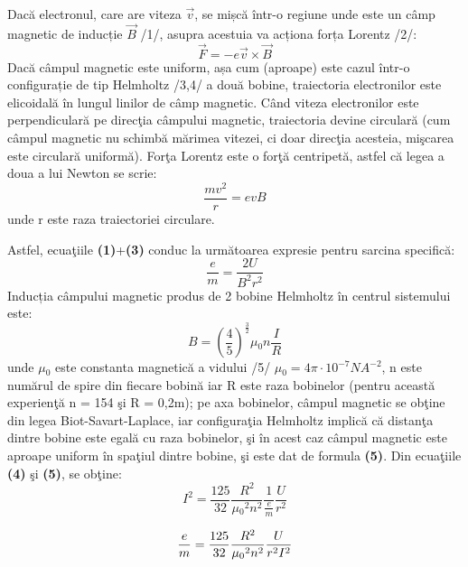 \documentclass{article}
\begin{document}
    \makebox[1.5cm]{} Dacă electronul, care are viteza $\vec{v}$, se mișcă într-o regiune unde este
    un câmp magnetic de inducție $\vec{B}$ /1/, asupra acestuia va acționa forța Lorentz /2/:
\begin{equation}
    \vec{F} = -e\vec{v}\times\vec{B}
\end{equation}
    \makebox[1.5cm]{} Dacă câmpul magnetic este uniform, așa cum (aproape) este cazul într-o configurație
    de tip Helmholtz /3,4/ a două bobine, traiectoria electronilor este elicoidală în
    lungul linilor de câmp magnetic. Când viteza electronilor este perpendiculară pe
    direcţia câmpului magnetic, traiectoria devine circulară (cum câmpul magnetic
    nu schimbă mărimea vitezei, ci doar direcţia acesteia, mişcarea este circulară uniformă).
    Forţa Lorentz este o forţă centripetă, astfel că legea a doua a lui Newton se scrie:
\begin{equation}
    \frac{mv^2}{r} = evB
\end{equation}
    unde r este raza traiectoriei circulare.

    Astfel, ecuaţiile \textbf{(1)}+\textbf{(3)} conduc la următoarea expresie pentru sarcina specifică:
\begin{equation}
    \frac{e}{m} = \frac{2U}{B^2r^2}
\end{equation}
    Inducția câmpului magnetic produs de 2 bobine Helmholtz în centrul sistemului este:
\begin{equation}
    B = (\frac{4}{5})^\frac{3}{2}{\mu}{_0}n\frac{I}{R}
\end{equation}
    unde ${\mu}{_0}$ este constanta magnetică a vidului /5/ ${\mu}{_0} = 4\pi \cdot 10^{-7}NA^{-2}$, n
    este numărul de spire din fiecare bobină iar R este raza bobinelor (pentru această experienţă
    n = 154 şi R = 0,2m); pe axa bobinelor, câmpul magnetic se obţine din legea Biot-Savart-Laplace,
    iar configuraţia Helmholtz implică că distanţa dintre bobine este egală cu raza bobinelor,
    şi în acest caz câmpul magnetic este aproape uniform în spaţiul dintre bobine, şi este dat
    de formula \textbf{(5)}. Din ecuaţiile \textbf{(4)} şi \textbf{(5)}, se obţine:
\begin{equation}
    I^2 = \frac{125}{32}\frac{R^2}{{{\mu}{_0}}^2n^2}\frac{1}{\frac{e}{m}}\frac{U}{r^2}
\end{equation}    

\begin{equation}
    \frac{e}{m} = \frac{125}{32}\frac{R^2}{{{\mu}{_0}}^2n^2}\frac{U}{r^2I^2} \newline
\end{equation}
\end{document}
